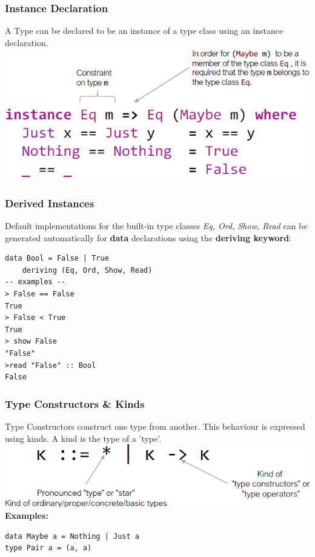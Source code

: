  \subsubsection{Instance Declaration}
 A Type can be declared to be an instance of a type class using an instance declaration.\\
 \includegraphics[width=0.8\linewidth]{img/instance_declaration.png}
 \subsubsection{Derived Instances}
 Default implementations for the built-in type classes \textit{Eq, Ord, Show, Read} can be generated automatically for \textbf{data} declarations using the \textbf{deriving keyword}:
 \begin{lstlisting}
data Bool = False | True
    deriving (Eq, Ord, Show, Read)
-- examples --
> False == False
True
> False < True
True
> show False
"False"
>read "False" :: Bool
False
\end{lstlisting}

\subsubsection{Type Constructors \& Kinds}
Type Constructors construct one type from another. This behaviour is expressed using kinds.
A kind is the type of a 'type'.\\
\includegraphics[width=0.7\linewidth]{img/type_constructors_kinds.png}\\
\textbf{Examples:}
\begin{lstlisting}
data Maybe a = Nothing | Just a
type Pair a = (a, a)
\end{lstlisting}

